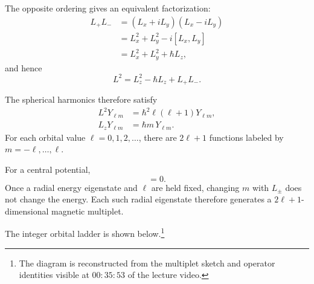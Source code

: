 The opposite ordering gives an equivalent factorization:
\begin{align}
L_+L_-
&=(L_x+iL_y)(L_x-iL_y) \\
&=L_x^2+L_y^2-i[L_x,L_y] \\
&=L_x^2+L_y^2+\hbar L_z,
\end{align}
and hence
\begin{equation}
L^2=L_z^2-\hbar L_z+L_+L_-.
\end{equation}

\begin{classroomqa}
\end{classroomqa}

The spherical harmonics therefore satisfy
\begin{align}
L^2Y_{\ell m}
&=\hbar^2\ell(\ell+1)Y_{\ell m}, \\
L_zY_{\ell m}
&=\hbar m\,Y_{\ell m}.
\end{align}
For each orbital value \(\ell=0,1,2,\ldots\), there are \(2\ell+1\) functions labeled by \(m=-\ell,\ldots,\ell\).

For a central potential,
\begin{equation}
[H,L_i]=0.
\end{equation}
Once a radial energy eigenstate and \(\ell\) are held fixed, changing \(m\) with \(L_\pm\) does not change the energy. Each such radial eigenstate therefore generates a \(2\ell+1\)-dimensional magnetic multiplet.

The integer orbital ladder is shown below.\footnote{The diagram is reconstructed from the multiplet sketch and operator identities visible at \(00{:}35{:}53\) of the lecture video.}

